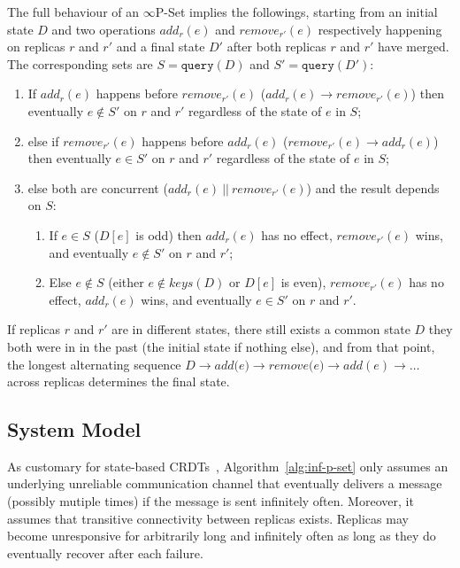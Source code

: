 \documentclass[10pt, oneside]{article}   	%
\begin{document}
The full behaviour of an $\infty$P-Set implies the followings, starting from an initial state $D$ and two operations $\textit{add}_r(e)$ and $\textit{remove}_{r'}(e)$ respectively happening on replicas $r$ and $r'$ and a final state $D'$ after both replicas $r$ and $r'$ have merged. The corresponding sets are $S=\texttt{query}(D)$ and $S'=\texttt{query}(D')$:
\begin{enumerate}
	\item If $\textit{add}_r(e)$ happens before $\textit{remove}_{r'}(e)$ ($\textit{add}_r(e)\rightarrow \textit{remove}_{r'}(e)$) then eventually $e \notin S'$ on $r$ and $r'$ regardless of the state of $e$ in $S$;
	\item else if $\textit{remove}_{r'}(e)$ happens before $\textit{add}_{r}(e)$ ($\textit{remove}_{r'}(e) \rightarrow  \textit{add}_r(e)$) then eventually $e \in S'$ on $r$ and $r'$ regardless of the state of $e$ in $S$;
	\item else both are concurrent ($add_r(e) ~||~ remove_{r'}(e)$) and the result depends on $S$:
	    \begin{enumerate}
		\item	 If $e \in S$ ($D[e]$ is odd) then $add_r(e)$ has no effect, $remove_{r'}(e)$ wins, and eventually $e \notin S'$ on $r$ and $r'$;
		\item Else $e \notin S$ (either $e \notin \textit{keys}(D)$ or $D[e]$ is even), $remove_{r'}(e)$  has no effect, $add_r(e)$ wins, and eventually $e \in S'$ on $r$ and $r'$.
	    \end{enumerate}
\end{enumerate}

If replicas $r$ and $r'$ are in different states, there still exists a common state $D$ they both were in in the past (the initial state if nothing else), and from that point, the longest alternating sequence $D \rightarrow \textit{add(e)} \rightarrow \textit{remove(e)}\rightarrow \textit{add}(e) \rightarrow \dots$ across replicas determines the final state.

\subsection{System Model}
\label{sec:system-model}

As customary for state-based CRDTs~\cite{shapiro:inria-00555588}, Algorithm~\ref{alg:inf-p-set} only assumes an underlying unreliable communication channel that eventually delivers  a message (possibly mutiple times) if the message is sent infinitely often. Moreover,  it assumes that transitive connectivity between replicas exists. Replicas may become unresponsive for arbitrarily long and infinitely often as long as they do eventually recover after each failure.
\end{document}
